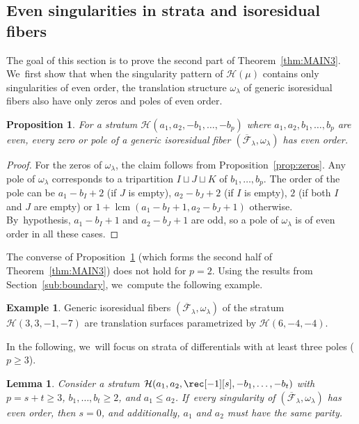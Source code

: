 \documentclass[JEP,XML,SOM,Unicode,NoFloatCountersInSection,published]{cedram}
\DeclareMathOperator{\lcm}{lcm}
\newtheorem{prop}[thm]{Proposition}
\newtheorem{lem}[thm]{Lemma}
\theoremstyle{definition}
\newtheorem{ex}[thm]{Example}
\begin{document}
\subsection{Even singularities in strata and isoresidual fibers}\label{sub:7even}

The goal of this section is to prove the second part of Theorem~\ref{thm:MAIN3}. We~first show that when the singularity pattern of $\mathcal{H}(\mu)$ contains only singularities of even order, the translation structure $\omega_\lambda$ of generic isoresidual fibers also have only zeros and poles of even order.

\begin{prop}\label{prop:Sec7Direct}
For a stratum $\mathcal{H}(a_{1},a_{2},-b_{1},\dots,-b_{p})$ where $a_{1},a_{2},b_{1},\dots,b_{p}$ are even, every zero or pole of a generic isoresidual fiber $(\overline{\mathcal{F}}_{\lambda},\omega_{\lambda})$ has even order.
\end{prop}

\begin{proof}
For the zeros of $\omega_{\lambda}$, the claim follows from Proposition~\ref{prop:zeros}. Any pole of $\omega_{\lambda}$ corresponds to a tripartition $I \sqcup J \sqcup K$ of $b_{1},\dots,b_{p}$. The order of the pole can be $a_{1}-b_{I}+2$ (if $J$ is empty), $a_{2}-b_{J}+2$ (if $I$ is empty), $2$ (if both $I$ and $J$ are empty) or $1+\lcm(a_{1}-b_{I}+1,a_{2}-b_{J}+1)$ otherwise. By~hypothesis, $a_{1}-b_{I}+1$ and $a_{2}-b_{J}+1$ are odd, so a pole of $\omega_{\lambda}$ is of even order in all these cases.
\end{proof}

The converse of Proposition~\ref{prop:Sec7Direct} (which forms the second half of Theorem~\ref{thm:MAIN3}) does not hold for $p=2$. Using the results from Section~\ref{sub:boundary}, we~compute the following example.

\begin{ex}
Generic isoresidual fibers $(\overline{\mathcal{F}}_{\lambda},\omega_{\lambda})$ of the stratum $\mathcal{H}(3,3,-1,-7)$ are translation surfaces parametrized by $\mathcal{H}(6,-4,-4)$.
\end{ex}

In the following, we~will focus on strata of differentials with at least three poles (\ie $p\geq 3$).

\begin{lem}\label{lem:nosimplepole}
Consider a stratum $\mathcal{H}(a_{1},a_{2},\rec[-1][s],-b_{1},\dots,-b_{t})$ with $p=s+t \geq 3$, $b_{1},\dots,b_{t} \geq 2$, and $a_{1} \leq a_{2}$. If~every singularity of $(\overline{\mathcal{F}}_{\lambda},\omega_{\lambda})$ has even order, then $s=0$, and additionally, $a_{1}$ and $a_{2}$ must have the same parity.
\end{lem}
\end{document}
